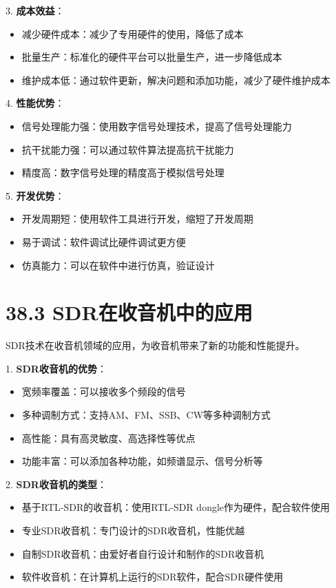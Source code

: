 \documentclass[12pt,UTF8]{ctexbook}
\begin{document}
3. \textbf{成本效益}：
   \begin{itemize}[leftmargin=3.5em]
   \item 减少硬件成本：减少了专用硬件的使用，降低了成本
   \item 批量生产：标准化的硬件平台可以批量生产，进一步降低成本
   \item 维护成本低：通过软件更新，解决问题和添加功能，减少了硬件维护成本
   \end{itemize}

4. \textbf{性能优势}：
   \begin{itemize}[leftmargin=3.5em]
   \item 信号处理能力强：使用数字信号处理技术，提高了信号处理能力
   \item 抗干扰能力强：可以通过软件算法提高抗干扰能力
   \item 精度高：数字信号处理的精度高于模拟信号处理
   \end{itemize}

5. \textbf{开发优势}：
   \begin{itemize}[leftmargin=3.5em]
   \item 开发周期短：使用软件工具进行开发，缩短了开发周期
   \item 易于调试：软件调试比硬件调试更方便
   \item 仿真能力：可以在软件中进行仿真，验证设计
   \end{itemize}

\section*{38.3 SDR在收音机中的应用}

SDR技术在收音机领域的应用，为收音机带来了新的功能和性能提升。

1. \textbf{SDR收音机的优势}：
   \begin{itemize}[leftmargin=3.5em]
   \item 宽频率覆盖：可以接收多个频段的信号
   \item 多种调制方式：支持AM、FM、SSB、CW等多种调制方式
   \item 高性能：具有高灵敏度、高选择性等优点
   \item 功能丰富：可以添加各种功能，如频谱显示、信号分析等
   \end{itemize}

2. \textbf{SDR收音机的类型}：
   \begin{itemize}[leftmargin=3.5em]
   \item 基于RTL-SDR的收音机：使用RTL-SDR dongle作为硬件，配合软件使用
   \item 专业SDR收音机：专门设计的SDR收音机，性能优越
   \item 自制SDR收音机：由爱好者自行设计和制作的SDR收音机
   \item 软件收音机：在计算机上运行的SDR软件，配合SDR硬件使用
   \end{itemize}
\end{document}
